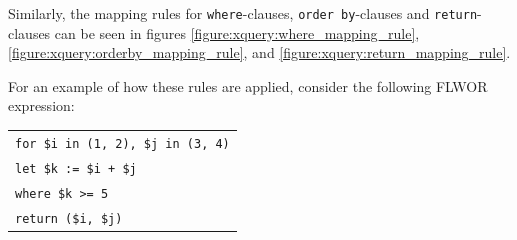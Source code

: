 Similarly, the mapping rules for \texttt{where}-clauses, \texttt{order by}-clauses and
\texttt{return}-clauses can be seen in figures \ref{figure:xquery:where_mapping_rule},
\ref{figure:xquery:orderby_mapping_rule},
and \ref{figure:xquery:return_mapping_rule}.

For an example of how these rules are applied, consider the following FLWOR
expression:
%
\begin{center}
\begin{tabular}{l}
\texttt{for \$i in (1, 2), \$j in (3, 4)} \\
  \texttt{let \$k := \$i + \$j} \\
  \texttt{where \$k >= 5} \\
   \texttt{return (\$i, \$j)} \\
\end{tabular}
\end{center}

